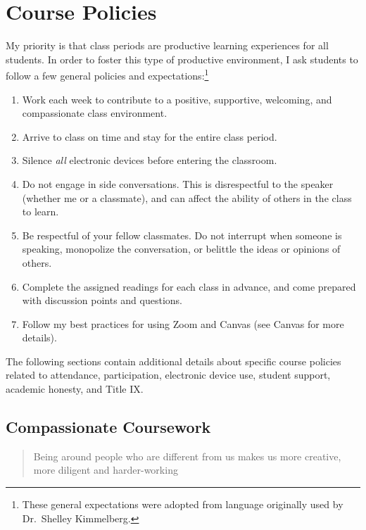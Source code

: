 \documentclass[
]{book}
\providecommand{\tightlist}{%
  \setlength{\itemsep}{0pt}\setlength{\parskip}{0pt}}
\begin{document}
\hypertarget{course-policies}{%
\chapter{Course Policies}\label{course-policies}}

My priority is that class periods are productive learning experiences for all students. In order to foster this type of productive environment, I ask students to follow a few general policies and expectations:\footnote{These general expectations were adopted from language originally used by Dr.~Shelley Kimmelberg.}

\begin{enumerate}
\def\labelenumi{\arabic{enumi}.}
\tightlist
\item
  Work each week to contribute to a positive, supportive, welcoming, and compassionate class environment.
\item
  Arrive to class on time and stay for the entire class period.
\item
  Silence \emph{all} electronic devices before entering the classroom.
\item
  Do not engage in side conversations. This is disrespectful to the speaker (whether me or a classmate), and can affect the ability of others in the class to learn.
\item
  Be respectful of your fellow classmates. Do not interrupt when someone is speaking, monopolize the conversation, or belittle the ideas or opinions of others.
\item
  Complete the assigned readings for each class in advance, and come prepared with discussion points and questions.
\item
  Follow my best practices for using Zoom and Canvas (see Canvas for more details).
\end{enumerate}

The following sections contain additional details about specific course policies related to attendance, participation, electronic device use, student support, academic honesty, and Title IX.

\hypertarget{compassionate-coursework}{%
\section{Compassionate Coursework}\label{compassionate-coursework}}

\begin{quote}
Being around people who are different from us makes us more creative, more diligent and harder-working
\end{quote}
\end{document}
